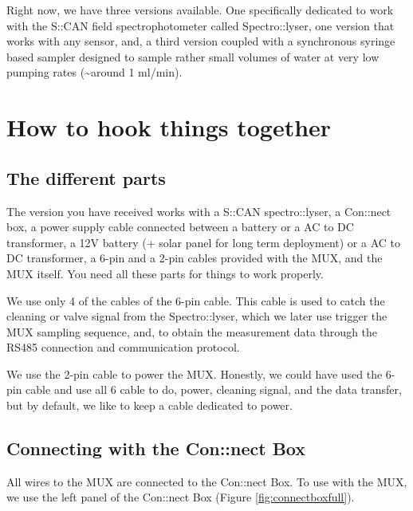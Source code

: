 \documentclass[]{book}
\begin{document}
Right now, we have three versions available. One specifically dedicated to work with the S::CAN field spectrophotometer called Spectro::lyser, one version that works with any sensor, and, a third version coupled with a synchronous syringe based sampler designed to sample rather small volumes of water at very low pumping rates (\textasciitilde{}around 1 ml/min).

\hypertarget{intro}{%
\chapter{How to hook things together}\label{intro}}

\hypertarget{the-different-parts}{%
\section{The different parts}\label{the-different-parts}}

The version you have received works with a S::CAN spectro::lyser, a Con::nect box, a power supply cable connected between a battery or a AC to DC transformer, a 12V battery (+ solar panel for long term deployment) or a AC to DC transformer, a 6-pin and a 2-pin cables provided with the MUX, and the MUX itself. You need all these parts for things to work properly.

We use only 4 of the cables of the 6-pin cable. This cable is used to catch the cleaning or valve signal from the Spectro::lyser, which we later use trigger the MUX sampling sequence, and, to obtain the measurement data through the RS485 connection and communication protocol.

We use the 2-pin cable to power the MUX. Honestly, we could have used the 6-pin cable and use all 6 cable to do, power, cleaning signal, and the data transfer, but by default, we like to keep a cable dedicated to power.

\hypertarget{connecting-with-the-connect-box}{%
\section{Connecting with the Con::nect Box}\label{connecting-with-the-connect-box}}

All wires to the MUX are connected to the Con::nect Box. To use with the MUX, we use the left panel of the Con::nect Box (Figure \ref{fig:connectboxfull}).
\end{document}
